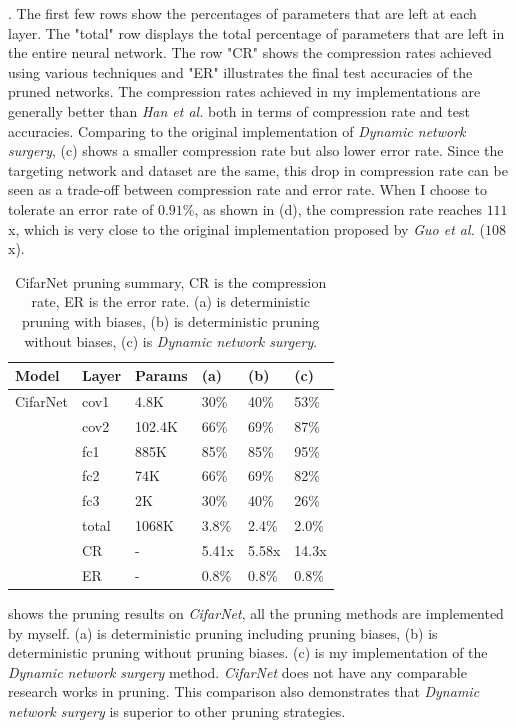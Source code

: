 \documentclass[a4paper,12pt]{report}
\begin{document}
\cite{Guo}.
The first few rows show the percentages of parameters that are left at each layer.
The "total" row displays the total percentage of parameters that are left in the entire
neural network.
The row "CR" shows the compression rates achieved using various techniques and
"ER" illustrates the final test accuracies of the pruned networks.
The compression rates achieved in my implementations are generally better than \textit{Han et al.}
both in terms of compression rate and test accuracies.
Comparing to the original implementation of \textit{Dynamic network surgery},
(c) shows a smaller compression rate but also lower error rate.
Since the targeting network and dataset are the same, this drop in compression
rate can be seen as a trade-off between compression rate and error rate.
When I choose to tolerate an error rate of $0.91\%$,
as shown in (d), the compression rate reaches $111$x, which is very close to the original implementation proposed by
\textit{Guo et al.} ($108$x).

\begin{table}[!h]
  \begin{tabular}{llllll}
    \hline
    Model   &Layer     &Params    &(a)  &(b)    &(c)  \\
    \hline
    CifarNet  &cov1     &4.8K       &30\%   &40\%   &53\% \\
            &cov2     &102.4K     &66\%   &69\%   &87\% \\
            &fc1      &885K       &85\%   &85\%   &95\% \\
            &fc2      &74K        &66\%   &69\%   &82\% \\
            &fc3      &2K         &30\%   &40\%   &26\% \\
            &total    &1068K      &3.8\%  &2.4\%  &2.0\% \\
    \hline

            &CR       &-          &5.41x   &5.58x  &14.3x \\
            &ER       &-          &0.8\%   &0.8\%  &0.8\% \\
    \hline
  \end{tabular}
  \centering
  \caption{CifarNet pruning summary, CR is the compression
  rate, ER is the error rate. (a) is deterministic pruning with biases, (b) is
  deterministic pruning without biases, (c) is \textit{Dynamic network surgery}.}
  \label{fig:cifar_prune_org_summary}
\end{table}
 shows the pruning results on \textit{CifarNet},
all the pruning methods are implemented by myself.
(a) is deterministic pruning including pruning biases, (b) is deterministic
pruning without pruning biases.
(c) is my implementation of the \textit{Dynamic network surgery} method.
\textit{CifarNet} does not have any comparable research works in pruning.
This comparison also demonstrates that \textit{Dynamic network surgery}
is superior to other pruning strategies.
\end{document}
